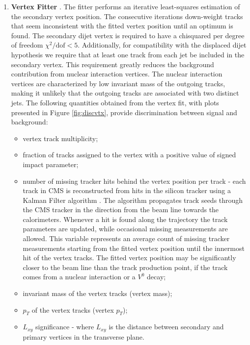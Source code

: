 \begin{enumerate}

\item{\bf Vertex Fitter}
\label{subsec:AVF}
\cite{Waltenberger:1166320}. The fitter performs an iterative least-squares estimation of the
 secondary vertex position. The consecutive iterations down-weight tracks that seem inconsistent
with the fitted vertex position until an optimum is found.
 The secondary dijet vertex is required to have a chisquared per degree of freedom 
$\chi^2/\text{dof} < 5$. Additionally, for compatibility with the displaced dijet hypothesis we require that at least 
one track from each jet be included in the secondary vertex. 
This requirement greatly reduces the background contribution
from nuclear interaction vertices. The nuclear interaction vertices are characterized by low invariant mass
of the outgoing tracks, making it unlikely that the outgoing tracks are associated with
two distinct jets. 
The following quantities obtained from the vertex fit, with plots presented in Figure
\ref{fig:discvtx}, provide discrimination between signal and background:
\begin{itemize}
 \item vertex track multiplicity;
 \item fraction of tracks assigned to the vertex with a positive value of signed impact parameter;
 \item number of missing tracker hits behind the vertex position per track - each track in CMS is reconstructed 
from hits in the silicon tracker using a Kalman Filter algorithm \cite{Giordano:2012hr}. The algorithm propagates
 track seeds through the CMS tracker in the direction from the beam line towards the calorimeters. Whenever a hit 
is found along the trajectory the track parameters are updated, while occasional missing measurements 
are allowed. 
This variable represents an average count of missing tracker measurements 
starting from the fitted vertex position until the innermost hit of the vertex tracks. The fitted vertex position
may be significantly closer to the beam line than the track production point, if the track comes from a nuclear
 interaction or a $V^0$ decay;
 \item invariant mass of the vertex tracks (vertex mass);
 \item $p_T$ of the vertex tracks (vertex $p_T$);
 \item $L_{xy}$ significance - where $L_{xy}$ is the distance between secondary and primary vertices
in the transverse plane.
\end{itemize}



\end{enumerate}
